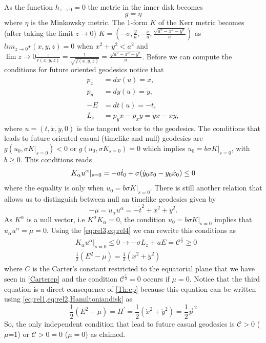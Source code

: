 \begin{Proof}
 As the function $h_{z \to 0}=0$ the metric in the inner disk becomes
 \begin{equation}
  g=\eta
 \end{equation}
 where $\eta$ is the Minkowsky metric. The 1-form $K$ of the Kerr metric becomes (after taking the limit $z \to 0$) $K=\left(-\sigma ,\frac{y}{a},-\frac{x}{a},\frac{\sqrt{a^2-x^2-y^2}}{a}\right)$ as $lim_{z \to 0} r(x,y,z)=0$ when $x^2+y^2<a^2$ and $\lim{z \to 0} \frac{z}{r(x,y,z)}=\frac{1}{\sqrt{f(x,y,\bar{z})}}=\frac{\sqrt{a^2-x^2-y^2}}{a}$. Before we can compute the conditions for future oriented geodesics notice that
 \begin{align}
  p_x&=dx(u)=\dot{x}, \label{eq:rel1} \\
  p_y&=dy(u)=\dot{y}, \label{eq:rel2} \\
  -E&=dt(u)=-\dot{t},\label{eq:rel3} \\
  L_z&= p_y x - p_x y= \dot{y} x- x \dot{y} \label{eq:rel4},
 \end{align}
 where $u=({t},\dot{x},\dot{y},0)$ is the tangent vector to the geodesics. The conditions that leads to future oriented casual (timelike and null) geodesics are $g(u_0, \sigma K |_{s=0}) <0$ or $g(u_0, \sigma K_{s=0}) =0$ which implies $u_0 = b \sigma K|_{s=0}$, with $b \geq 0$. This conditions reads
 \begin{equation}
  K_\alpha u^\alpha|_{s=0} = -a   \dot{t}_0+\sigma(\dot{y}_0 x_0-y_0 \dot{x}_0) \leq 0\\
 \end{equation}
where the equality is only when $u_0 = b \sigma K|_{s=0}$. There is still another relation that allows us to distinguish between null an timelike geodesics given by
 \begin{equation}
  -\mu = u_\alpha u^\alpha = -\dot{t}^2+\dot{x}^2+\dot{y}^2.
 \end{equation}
As $K^\alpha$ is a null vector, i.e $K^\alpha K_\alpha=0$, the condition $u_0 = b \sigma K|_{s=0}$ implies that $u_\alpha u^\alpha=\mu=0$. Using the \cref{eq:rel3,eq:rel4} we can rewrite this conditions as
\begin{align}
  &K_\alpha u^\alpha|_{s=0} \leq 0 \rightarrow -\sigma L_z+  a E = \mathcal{C}^{\frac{1}{2}} \geq 0\\
  &\frac{1}{2} \left( E^2-\mu \right) =  \frac{1}{2} \left( \dot{x}^2+\dot{y}^2 \right)
\end{align}
 where $C$ is the Carter's constant restricted to the equatorial plane that we have seen in \vref{Carterep} and the condition $\mathcal{C}^{\frac{1}{2}}=0$ occurs if
 $\mu=0$. Notice that the third equation is a direct consequence of \cref{Th:ep} because this equation can be written using \cref{eq:rel1,eq:rel2,Hamiltoniandisk} as
\begin{equation}
 \frac{1}{2}\left(E^2-\mu \right)=H^{\prime}=  \frac{1}{2} \left( \dot{x}^2+\dot{y}^2 \right)= \frac{1}{2} \vec{p}^{\,2}
\end{equation}
So, the only independent condition that lead to future casual geodesics is $\mathcal{C}>0$ ($\mu$=1) or $\mathcal{C}>0=0$ ($\mu=0$) as claimed.\end{Proof}

